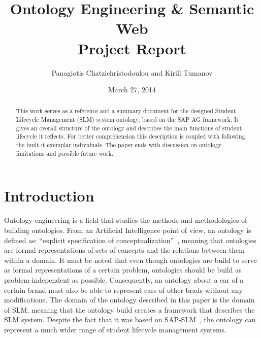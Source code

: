\documentclass{article}    %
\title{Ontology Engineering \& Semantic Web \\ Project Report}  %
\author{Panagiotis Chatzichristodoulou and Kirill Tumanov}    %
\date{March 27, 2014}   %
\begin{document}
%
\maketitle                 %
%
\begin{abstract}
%
This work serves as a reference and a summary document for the designed Student Lifecycle Management (SLM) system ontology, based on the SAP AG framework. It gives an overall structure of the ontology and describes the main functions of student lifecycle it reflects. For better comprehension this description is coupled with following the built-it exemplar individuals. The paper ends with discussion on ontology limitations and possible future work.
%
\end{abstract}
%
% 
\section{Introduction}
%
Ontology engineering is a field that studies the methods and methodologies of building ontologies. From an Artificial Intelligence point of view, an ontology is defined as: ``explicit specification of conceptualization''~\cite{Gruber}, meaning that ontologies are formal representations of sets of concepts and the relations between them within a domain. It must be noted that even though ontologies are build to serve as formal representations of a certain problem, ontologies should be build as problem-independent as possible. Consequently, an ontology about a car of a certain brand must also be able to represent cars of other brads without any modifications. The domain of the ontology described in this paper is the domain of SLM, meaning that the ontology build creates a framework that describes the SLM system. Despite the fact that it was based on SAP-SLM~\cite{sap}, the ontology can represent a much wider range of student lifecycle management systems.
% 
\end{document}
